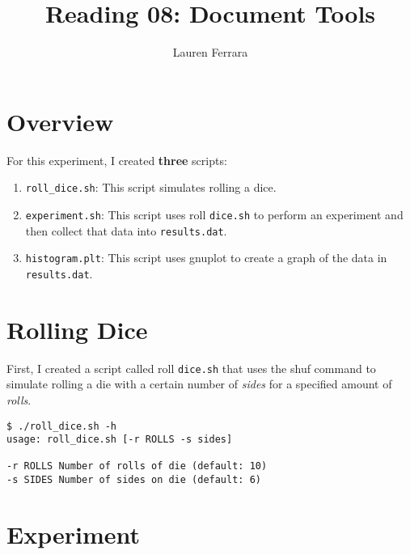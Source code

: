 \documentclass[letterpaper]{article}
\title{Reading 08: Document Tools}
\date{}
\author{Lauren Ferrara}
\begin{document}
\maketitle


\section*{Overview}

For this experiment, I created {\bf three} scripts:

\begin{enumerate}

\item{\tt roll\_dice.sh}: This script simulates rolling a dice.

\item{\tt experiment.sh}: This script uses roll {\tt dice.sh} to perform an experiment and then collect that data into {\tt results.dat}.

\item{\tt histogram.plt}: This script uses gnuplot to create a graph of the data in {\tt results.dat}.

\end{enumerate}


\section*{Rolling Dice}

First, I created a script called roll {\tt dice.sh} that uses the shuf command to simulate rolling a die with a certain number of {\it sides} for a specified amount of {\it rolls}.

\begin{verbatim}
$ ./roll_dice.sh -h
usage: roll_dice.sh [-r ROLLS -s sides]

-r ROLLS Number of rolls of die (default: 10)
-s SIDES Number of sides on die (default: 6)
\end{verbatim}


\section*{Experiment}
\end{document}
